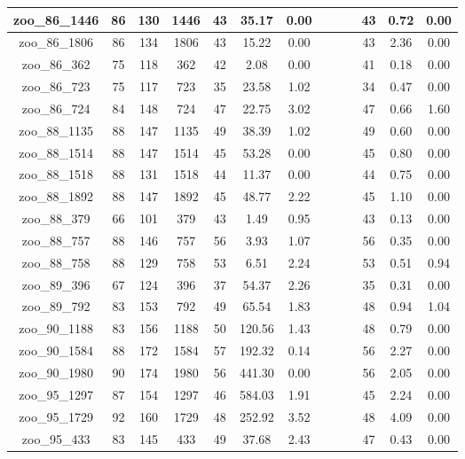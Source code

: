 \begin{landscape}
\begin{longtable}{|c|c|c|c|c|c|c|c|c|c|c|c|c|}
zoo\_86\_1446 & 86 & 130 & 1446 & 43 & 35.17 & 0.00 &  &  &  & 43 & 0.72 & 0.00 \\ \hline 
zoo\_86\_1806 & 86 & 134 & 1806 & 43 & 15.22 & 0.00 &  &  &  & 43 & 2.36 & 0.00 \\ \hline 
zoo\_86\_362 & 75 & 118 & 362 & 42 & 2.08 & 0.00 &  &  &  & 41 & 0.18 & 0.00 \\ \hline 
zoo\_86\_723 & 75 & 117 & 723 & 35 & 23.58 & 1.02 &  &  &  & 34 & 0.47 & 0.00 \\ \hline 
zoo\_86\_724 & 84 & 148 & 724 & 47 & 22.75 & 3.02 &  &  &  & 47 & 0.66 & 1.60 \\ \hline 
zoo\_88\_1135 & 88 & 147 & 1135 & 49 & 38.39 & 1.02 &  &  &  & 49 & 0.60 & 0.00 \\ \hline 
zoo\_88\_1514 & 88 & 147 & 1514 & 45 & 53.28 & 0.00 &  &  &  & 45 & 0.80 & 0.00 \\ \hline 
zoo\_88\_1518 & 88 & 131 & 1518 & 44 & 11.37 & 0.00 &  &  &  & 44 & 0.75 & 0.00 \\ \hline 
zoo\_88\_1892 & 88 & 147 & 1892 & 45 & 48.77 & 2.22 &  &  &  & 45 & 1.10 & 0.00 \\ \hline 
zoo\_88\_379 & 66 & 101 & 379 & 43 & 1.49 & 0.95 &  &  &  & 43 & 0.13 & 0.00 \\ \hline 
zoo\_88\_757 & 88 & 146 & 757 & 56 & 3.93 & 1.07 &  &  &  & 56 & 0.35 & 0.00 \\ \hline 
zoo\_88\_758 & 88 & 129 & 758 & 53 & 6.51 & 2.24 &  &  &  & 53 & 0.51 & 0.94 \\ \hline 
zoo\_89\_396 & 67 & 124 & 396 & 37 & 54.37 & 2.26 &  &  &  & 35 & 0.31 & 0.00 \\ \hline 
zoo\_89\_792 & 83 & 153 & 792 & 49 & 65.54 & 1.83 &  &  &  & 48 & 0.94 & 1.04 \\ \hline 
zoo\_90\_1188 & 83 & 156 & 1188 & 50 & 120.56 & 1.43 &  &  &  & 48 & 0.79 & 0.00 \\ \hline 
zoo\_90\_1584 & 88 & 172 & 1584 & 57 & 192.32 & 0.14 &  &  &  & 56 & 2.27 & 0.00 \\ \hline 
zoo\_90\_1980 & 90 & 174 & 1980 & 56 & 441.30 & 0.00 &  &  &  & 56 & 2.05 & 0.00 \\ \hline 
zoo\_95\_1297 & 87 & 154 & 1297 & 46 & 584.03 & 1.91 &  &  &  & 45 & 2.24 & 0.00 \\ \hline 
zoo\_95\_1729 & 92 & 160 & 1729 & 48 & 252.92 & 3.52 &  &  &  & 48 & 4.09 & 0.00 \\ \hline 
zoo\_95\_433 & 83 & 145 & 433 & 49 & 37.68 & 2.43 &  &  &  & 47 & 0.43 & 0.00 \\ \hline 

\end{longtable}
\end{landscape}
